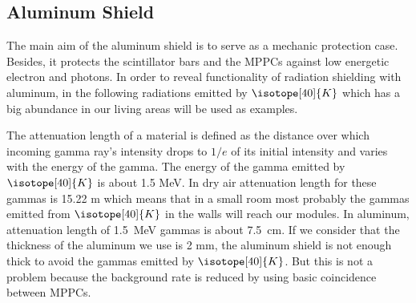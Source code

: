 \documentclass[a4paper]{article}\linespread{1.4}
\begin{document}
\subsection{Aluminum Shield}
The main aim of the aluminum shield is to serve as a mechanic protection case. Besides, it protects the scintillator bars and the MPPCs against low energetic electron and photons.
In order to reveal functionality of radiation shielding with aluminum, in the following radiations emitted by $\isotope[40]{K}$ which has a big abundance in our living areas will be used as examples.

The attenuation length of a material is defined as the distance over which incoming gamma ray's intensity drops to $1/e$ of its initial intensity and varies with the energy of the gamma. 
The energy of the gamma emitted by $\isotope[40]{K}$ is about 1.5 MeV. In dry air attenuation length for these gammas is 15.22 m which means that in a small room most probably the gammas emitted from $\isotope[40]{K}$ in the walls will reach our modules. In aluminum, attenuation length of 1.5~MeV gammas is about 7.5~cm. If we consider that the thickness of the aluminum we use is 2 mm, the aluminum shield is not enough thick to avoid the gammas emitted by $\isotope[40]{K}$. But this is not a problem because the background rate is reduced by using basic coincidence between MPPCs.

\end{document}
